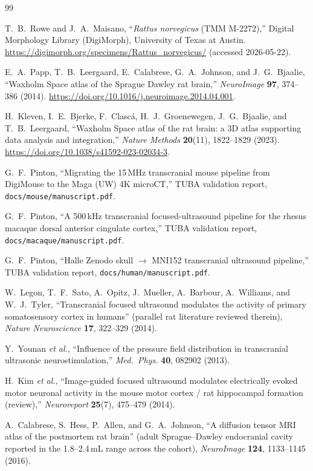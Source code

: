 \documentclass{compactarticle}
\begin{document}
\begin{thebibliography}{99}

 T.~B.~Rowe and J.~A.~Maisano,
  ``\emph{Rattus norvegicus} (TMM M-2272),''
  Digital Morphology Library (DigiMorph), University of Texas at
  Austin. \url{https://digimorph.org/specimens/Rattus_norvegicus/}
  (accessed 2026-05-22).

 E.~A.~Papp, T.~B.~Leergaard, E.~Calabrese,
  G.~A.~Johnson, and J.~G.~Bjaalie,
  ``Waxholm Space atlas of the Sprague Dawley rat brain,''
  \emph{NeuroImage} {\bf 97}, 374--386 (2014).
  \url{https://doi.org/10.1016/j.neuroimage.2014.04.001}.

 H.~Kleven, I.~E.~Bjerke, F.~Clasc\'a,
  H.~J.~Groenewegen, J.~G.~Bjaalie, and T.~B.~Leergaard,
  ``Waxholm Space atlas of the rat brain: a 3D atlas supporting
  data analysis and integration,''
  \emph{Nature Methods} {\bf 20}(11), 1822--1829 (2023).
  \url{https://doi.org/10.1038/s41592-023-02034-3}.

 G.~F.~Pinton,
  ``Migrating the 15\,MHz transcranial mouse pipeline from
  DigiMouse to the Maga (UW) 4K microCT,''
  TUBA validation report, \texttt{docs/mouse/manuscript.pdf}.

 G.~F.~Pinton,
  ``A 500\,kHz transcranial focused-ultrasound pipeline for the
  rhesus macaque dorsal anterior cingulate cortex,''
  TUBA validation report, \texttt{docs/macaque/manuscript.pdf}.

 G.~F.~Pinton,
  ``Halle Zenodo skull \(\to\) MNI152 transcranial ultrasound
  pipeline,'' TUBA validation report,
  \texttt{docs/human/manuscript.pdf}.

 W.~Legon, T.~F.~Sato, A.~Opitz, J.~Mueller,
  A.~Barbour, A.~Williams, and W.~J.~Tyler,
  ``Transcranial focused ultrasound modulates the activity of primary
  somatosensory cortex in humans'' (parallel rat literature reviewed
  therein),
  \emph{Nature Neuroscience} {\bf 17}, 322--329 (2014).

 Y.~Younan \emph{et al.},
  ``Influence of the pressure field distribution in transcranial
  ultrasonic neurostimulation,''
  \emph{Med.\ Phys.} {\bf 40}, 082902 (2013).

 H.~Kim \emph{et al.},
  ``Image-guided focused ultrasound modulates electrically evoked
  motor neuronal activity in the mouse motor cortex / rat hippocampal
  formation (review),''
  \emph{Neuroreport} {\bf 25}(7), 475--479 (2014).

 A.~Calabrese, S.~Hess, P.~Allen, and
  G.~A.~Johnson, ``A diffusion tensor MRI atlas of the postmortem
  rat brain'' (adult Sprague--Dawley endocranial cavity reported in
  the 1.8--2.4\,mL range across the cohort),
  \emph{NeuroImage} {\bf 124}, 1133--1145 (2016).

\end{thebibliography}
\end{document}
